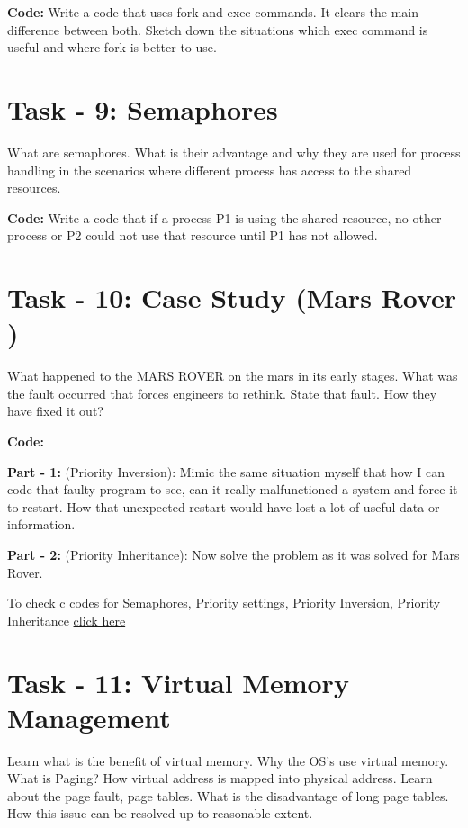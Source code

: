 \documentclass[letterpaper,10pt,english]{sphinxmanual}
\begin{document}
\textbf{Code:} Write a code that uses fork and exec commands. It clears the main difference between both. Sketch down the situations  which exec command is useful and where fork is better to use.


\section{Task - 9: Semaphores}
\label{week-02:task-9-semaphores}
What are semaphores. What is their advantage and why they are used for process handling in the scenarios where different process has access to the shared resources.

\textbf{Code:} Write a code that if a  process P1 is using the shared resource, no other process or P2 could not use that resource until P1 has not allowed.


\section{Task - 10: Case Study (Mars Rover )}
\label{week-02:task-10-case-study-mars-rover}
What happened to the MARS ROVER on the mars in its early stages. What was the fault occurred that forces engineers to rethink. State that fault. How they have fixed it out?

\textbf{Code:}

\textbf{Part - 1:} (Priority Inversion): Mimic the same situation myself that how I can code that faulty program to see, can it really malfunctioned a system and force it to restart. How that unexpected restart would have lost a lot of useful data or information.

\textbf{Part - 2:} (Priority Inheritance): Now solve the problem as it was solved for Mars Rover.

To check c codes for Semaphores, Priority settings, Priority Inversion, Priority Inheritance  \href{https://github.com/Ahmer-444/personal-repo/tree/master/Priority\_Inversion}{click here}


\section{Task - 11: Virtual Memory Management}
\label{week-02:task-11-virtual-memory-management}
Learn what is the benefit of virtual memory. Why the OS's use virtual memory. What is Paging? How virtual address is mapped into physical address. Learn about the page fault, page tables. What is the disadvantage of long page tables. How this issue can be resolved up to reasonable extent.
\end{document}
